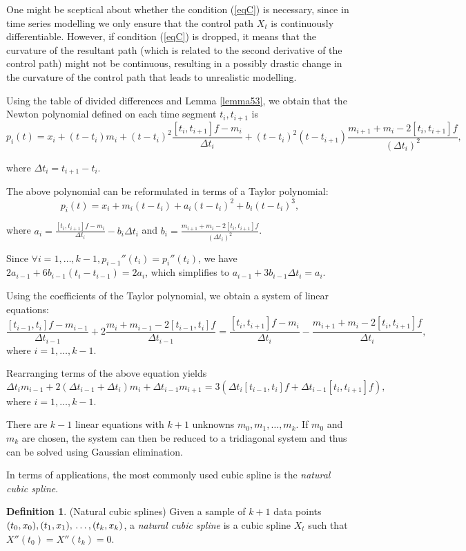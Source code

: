\documentclass[a4paper,11pt,titlepage]{article}
\theoremstyle{definition}
\newtheorem{definition}{Definition}[section]
\theoremstyle{plain}
\theoremstyle{remark}
\begin{document}
One might be sceptical about whether the condition (\ref{eqC}) is necessary, since in time series modelling we only ensure that the control path $X_t$ is continuously differentiable. However, if condition (\ref{eqC}) is dropped, it means that the curvature of the resultant path (which is related to the second derivative of the control path) might not be continuous, resulting in a possibly drastic change in the curvature of the control path that leads to unrealistic modelling.

Using the table of divided differences and Lemma \ref{lemma53}, we obtain that the Newton polynomial defined on each time segment $t_i,t_{i+1}$ is
$$p_i(t)=x_i+(t-t_i)m_i+(t-t_i)^2\frac{[t_i,t_{i+1}]f-m_i}{\Delta t_i}+(t-t_i)^2(t-t_{i+1})\frac{m_{i+1}+m_i-2[t_i,t_{i+1}]f}{(\Delta t_i)^2},$$

where $\Delta t_i=t_{i+1}-t_i$.

The above polynomial can be reformulated in terms of a Taylor polynomial:
$$p_i(t)=x_i+m_i(t-t_i)+a_i(t-t_i)^2+b_i(t-t_i)^3,$$

where $\displaystyle a_i=\frac{[t_i,t_{i+1}]f-m_i}{\Delta t_i}-b_i\Delta t_i$ and $\displaystyle b_i=\frac{m_{i+1}+m_i-2[t_i,t_{i+1}]f}{(\Delta t_i)^2}$.

Since $\forall i=1,\dots,k-1, p_{i-1}''(t_i)=p_i''(t_i)$, we have $2a_{i-1}+6b_{i-1}(t_i-t_{i-1})=2a_i$, which simplifies to $a_{i-1}+3b_{i-1}\Delta t_i=a_i$.

Using the coefficients of the Taylor polynomial, we obtain a system of linear equations:
$$\frac{[t_{i-1},t_i]f-m_{i-1}}{\Delta t_{i-1}}+2\frac{m_i+m_{i-1}-2[t_{i-1},t_i]f}{\Delta t_{i-1}}=\frac{[t_i,t_{i+1}]f-m_i}{\Delta t_{i}}-\frac{m_{i+1}+m_{i}-2[t_{i},t_{i+1}]f}{\Delta t_{i}},$$
where $i=1,\dots,k-1$.

Rearranging terms of the above equation yields
$$\Delta t_im_{i-1}+2(\Delta t_{i-1}+\Delta t_i)m_i+\Delta t_{i-1}m_{i+1}=3(\Delta t_i[t_{i-1},t_i]f+\Delta t_{i-1}[t_i,t_{i+1}]f),$$
where $i=1,\dots,k-1$.

There are $k-1$ linear equations with $k+1$ unknowns $m_0,m_1,\dots,m_k$. If $m_0$ and $m_k$ are chosen, the system can then be reduced to a tridiagonal system and thus can be solved using Gaussian elimination.

In terms of applications, the most commonly used cubic spline is the \textit{natural cubic spline}.
\begin{definition}
    (Natural cubic splines) Given a sample of $k+1$ data points
$(t_0,x_0), (t_1,x_1), \\\dots, (t_k,x_k)$, a \textit{natural cubic spline} is a cubic spline $X_t$ such that $X''(t_0)=X''(t_k)=0$.
\end{definition}
\end{document}
